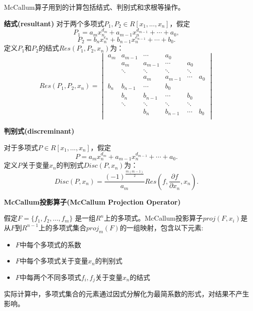 McCallum算子用到的计算包括结式、判别式和求根等操作。
\begin{definition}{\textbf{结式(resultant)}}
对于两个多项式$P_1, P_2 \in R[x_1, ..., x_n]$，假定$$
P_1 = a_m x_n^{d_m} + a_{m-1} x_n^{d_{m-1}} + \cdots + a_0,
$$
$$
P_2 = b_n x_n^{e_n} + b_{n-1} x_n^{e_{n-1}} + \cdots + b_0.
$$
定义$P_1$和$P_2$的结式$Res(P_1, P_2, x_n)$为：
$$
Res(P_1, P_2, x_n) = 
\begin{vmatrix}
    a_m & a_{m-1} & \cdots & a_0 \\
    & a_m & a_{m-1} & \cdots & a_0 \\
    & \ddots & \ddots & \ddots & \ddots & \\
    & & a_m & a_{m-1} & \cdots & a_0 \\

    b_n & b_{n-1} & \cdots & b_0 \\
    & b_n & b_{n-1} & \cdots & b_0 \\
    & \ddots & \ddots & \ddots & \ddots & \\
    & & b_n & b_{n-1} & \cdots & b_0 \\
    \end{vmatrix}
$$
\end{definition}

\begin{definition}{\textbf{判别式(discreminant)}}

对于多项式$P \in R[x_1, ..., x_n]$，假定$$
P = a_m x_n^{d_m} + a_{m-1} x_n^{d_{m-1}} + \cdots + a_0.
$$
定义$P$关于变量$x_n$的判别式$Disc(P, x_n)$为：  
$$
Disc(P, x_n) = \frac{(-1)^{\frac{m(m-1)}{2}}}{a_m} Res(f, \frac{\partial f}{\partial x_n}, x_n). 
$$
\end{definition}

\begin{definition}{\textbf{McCallum投影算子(McCallum Projection Operator)}}

假定$F = \{f_1, f_2, \dots, f_m\}$ 是一组$R^n$上的多项式。McCallum投影算子$proj(F, x_i)$是从$F$到$R^{n-1}$上的多项式集合$proj_m(F)$的一组映射，包含以下元素:
\begin{itemize}
    \item $F$中每个多项式的系数
    \item $F$中每个多项式关于变量$x_n$的判别式
    \item $F$中每两个不同多项式$f_i, f_j$关于变量$x_n$的结式
\end{itemize}
实际计算中，多项式集合的元素通过因式分解化为最简系数的形式，对结果不产生影响。
\end{definition}

